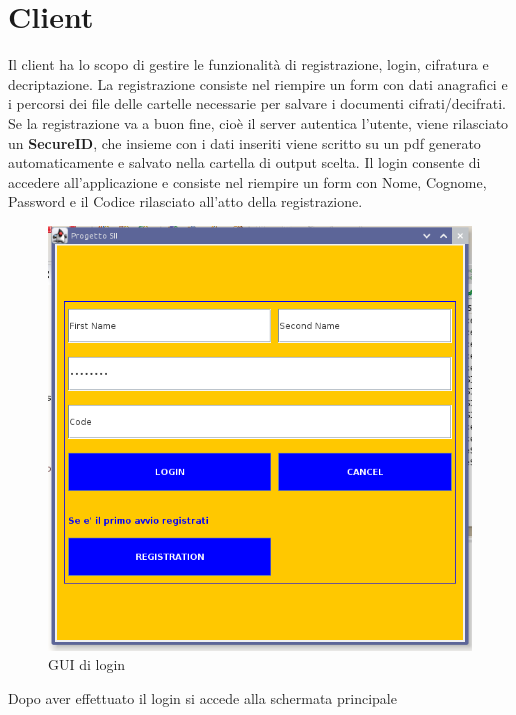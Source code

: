 \section{Client}
Il client ha lo scopo di gestire le funzionalità di registrazione, login, cifratura e decriptazione.
La registrazione consiste nel riempire un form con dati anagrafici e i percorsi dei file delle cartelle necessarie per salvare i documenti cifrati/decifrati. Se la registrazione va a buon fine, cioè il server autentica l'utente, viene rilasciato un \textbf{SecureID}, che insieme con i dati inseriti viene scritto su un pdf generato automaticamente e salvato nella cartella di output scelta.
Il login consente di accedere all'applicazione e consiste nel riempire un form con Nome, Cognome, Password e il Codice rilasciato all'atto della registrazione. 

	\begin{center}	
		\begin{figure}[H]
		\centering
		\includegraphics[scale=0.7]{Immagini/login}
		\caption[Login]{GUI di login}
		\label{fig:login}
		\end{figure}
	\end{center}
	
Dopo aver effettuato il login si accede alla schermata principale

